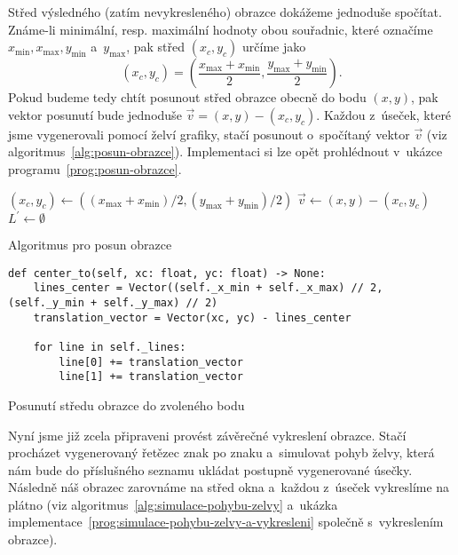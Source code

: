 Střed výsledného (zatím nevykresleného) obrazce dokážeme jednoduše spočítat. Známe-li minimální, resp. maximální hodnoty obou souřadnic, které označíme $x_{\text{min}},x_{\text{max}},y_{\text{min}}$ a~$y_{\text{max}}$, pak střed $(x_c,y_c)$ určíme jako
\[(x_c,y_c)=\left(\dfrac{x_{\text{max}}+x_{\text{min}}}{2},\dfrac{y_{\text{max}}+y_{\text{min}}}{2}\right).\]
Pokud budeme tedy chtít posunout střed obrazce obecně do bodu $(x,y)$, pak vektor posunutí bude jednoduše $\vec{v}=(x,y)-(x_c,y_c)$. Každou z~úseček, které jsme vygenerovali pomocí želví grafiky, stačí posunout o~spočítaný vektor $\vec{v}$ (viz algoritmus~\ref{alg:posun-obrazce}). Implementaci si lze opět prohlédnout v~ukázce programu~\ref{prog:posun-obrazce}.
\begin{algorithm}[h]
    $(x_c,y_c)\gets((x_{\text{max}}+x_{\text{min}})/2,(y_{\text{max}}+y_{\text{min}})/2)$\;
    $\vec{v}\gets(x,y)-(x_c,y_c)$\;
    $L^\prime\gets\emptyset$\;
    \;
    \caption{Algoritmus pro posun obrazce}
    \label{alg:posun-obrazce}
\end{algorithm}
\begin{program}[h]
\begin{lstlisting}[style=python]
def center_to(self, xc: float, yc: float) -> None:
    lines_center = Vector((self._x_min + self._x_max) // 2, (self._y_min + self._y_max) // 2)
    translation_vector = Vector(xc, yc) - lines_center

    for line in self._lines:
        line[0] += translation_vector
        line[1] += translation_vector
\end{lstlisting}
    \caption{Posunutí středu obrazce do zvoleného bodu}
    \label{prog:posun-obrazce}
\end{program}
Nyní jsme již zcela připraveni provést závěrečné vykreslení obrazce. Stačí procházet vygenerovaný řetězec znak po znaku a~simulovat pohyb želvy, která nám bude do příslušného seznamu ukládat postupně vygenerované úsečky. Následně náš obrazec zarovnáme na střed okna a~každou z~úseček vykreslíme na plátno (viz algoritmus~\ref{alg:simulace-pohybu-zelvy} a~ukázka implementace~\ref{prog:simulace-pohybu-zelvy-a-vykresleni} společně s~vykreslením obrazce).
